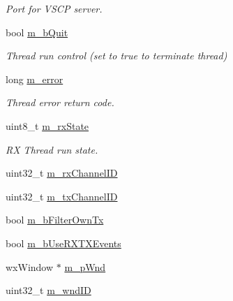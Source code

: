 \begin{DoxyCompactItemize}
\begin{DoxyCompactList}\small\item\em Port for VSCP server. \end{DoxyCompactList}\item 
\hypertarget{classctrl_obj_vscp_tcp_if_a182ab29b5260b36237cb4ea50dbf51fe}{
bool \hyperlink{classctrl_obj_vscp_tcp_if_a182ab29b5260b36237cb4ea50dbf51fe}{m\_\-bQuit}}
\label{d8/dde/classctrl_obj_vscp_tcp_if_a182ab29b5260b36237cb4ea50dbf51fe}

\begin{DoxyCompactList}\small\item\em Thread run control (set to true to terminate thread) \end{DoxyCompactList}\item 
\hypertarget{classctrl_obj_vscp_tcp_if_ac45448d145560bba8083202c19778cde}{
long \hyperlink{classctrl_obj_vscp_tcp_if_ac45448d145560bba8083202c19778cde}{m\_\-error}}
\label{d8/dde/classctrl_obj_vscp_tcp_if_ac45448d145560bba8083202c19778cde}

\begin{DoxyCompactList}\small\item\em Thread error return code. \end{DoxyCompactList}\item 
\hypertarget{classctrl_obj_vscp_tcp_if_a5e35a1bcb620c5545b9aca9134972c01}{
uint8\_\-t \hyperlink{classctrl_obj_vscp_tcp_if_a5e35a1bcb620c5545b9aca9134972c01}{m\_\-rxState}}
\label{d8/dde/classctrl_obj_vscp_tcp_if_a5e35a1bcb620c5545b9aca9134972c01}

\begin{DoxyCompactList}\small\item\em RX Thread run state. \end{DoxyCompactList}\item 
uint32\_\-t \hyperlink{classctrl_obj_vscp_tcp_if_a22384f365f0617f660bed9330bb637d7}{m\_\-rxChannelID}
\item 
uint32\_\-t \hyperlink{classctrl_obj_vscp_tcp_if_a1c2e68222d7d935dbcbf2efefa33d46f}{m\_\-txChannelID}
\item 
bool \hyperlink{classctrl_obj_vscp_tcp_if_a8a4453efbfba68f89494ccdb9cb77929}{m\_\-bFilterOwnTx}
\item 
bool \hyperlink{classctrl_obj_vscp_tcp_if_ae60bd1fba10f822b4076223b6468fb13}{m\_\-bUseRXTXEvents}
\item 
wxWindow $\ast$ \hyperlink{classctrl_obj_vscp_tcp_if_ad48e93cc32b5c4bc1c741c2bc0615b1a}{m\_\-pWnd}
\item 
\hypertarget{classctrl_obj_vscp_tcp_if_a0667263bdc6a051fcff1e2e919005da8}{
uint32\_\-t \hyperlink{classctrl_obj_vscp_tcp_if_a0667263bdc6a051fcff1e2e919005da8}{m\_\-wndID}}
\label{d8/dde/classctrl_obj_vscp_tcp_if_a0667263bdc6a051fcff1e2e919005da8}


\end{DoxyCompactItemize}
